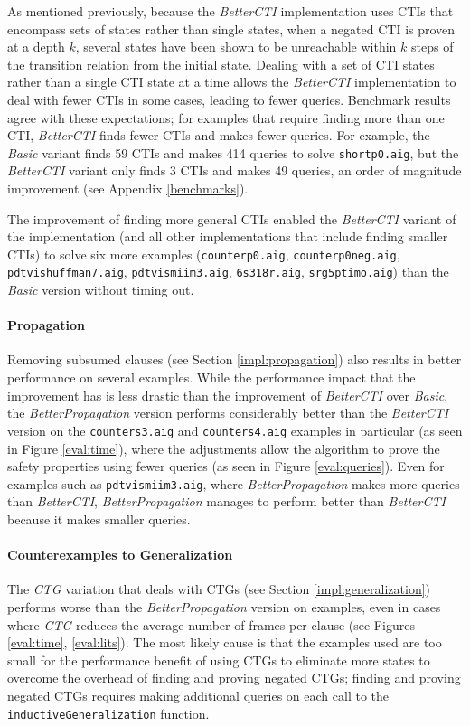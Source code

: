 \documentclass[12pt,a4paper,twoside,openright]{report}
\begin{document}
{{{As mentioned previously, because the \emph{BetterCTI} implementation uses
CTIs that encompass sets of states rather than single states, when a negated CTI is proven at a depth
$k$, several states have been shown to be unreachable within $k$ steps of the transition relation
from the initial state. Dealing with a set of CTI states rather than a single CTI state
at a time allows
the \emph{BetterCTI} implementation to deal with fewer CTIs in some cases,
leading to fewer queries.
Benchmark results
agree with these expectations; for examples that require finding more than one CTI, \emph{BetterCTI}
finds fewer CTIs and makes fewer queries.
For example, the \emph{Basic} variant finds 59 CTIs and makes 414 queries to solve
\verb,shortp0.aig,, but the \emph{BetterCTI} variant only finds 3 CTIs and makes 49 queries, an order of magnitude improvement (see Appendix \ref{benchmarks}). 

The improvement of finding more general CTIs enabled the \emph{BetterCTI} variant of the implementation
(and all other implementations that include finding smaller CTIs) to
solve six more examples (\verb,counterp0.aig,, \verb,counterp0neg.aig,, \verb,pdtvishuffman7.aig,, 
\verb,pdtvismiim3.aig,, \verb,6s318r.aig,, \verb,srg5ptimo.aig,) than the \emph{Basic} version without
timing out.}

\paragraph{Propagation}{
Removing subsumed clauses (see Section \ref{impl:propagation}) also results in better performance on several
examples. While the performance impact that the improvement has is less drastic than the improvement of
\emph{BetterCTI} over \emph{Basic}, the \emph{BetterPropagation} version performs
considerably better
than the \emph{BetterCTI} version on the \verb,counters3.aig, and \verb,counters4.aig, examples in
particular (as seen in Figure \ref{eval:time}), where the adjustments allow the algorithm to prove the safety properties using fewer
queries (as seen in Figure \ref{eval:queries}). Even for examples such as \verb,pdtvismiim3.aig,, where \emph{BetterPropagation} makes more
queries than \emph{BetterCTI}, \emph{BetterPropagation} manages to perform better than \emph{BetterCTI}
because it makes smaller queries.}

\paragraph{Counterexamples to Generalization}{
The \emph{CTG} variation that deals with CTGs (see Section \ref{impl:generalization})
performs worse than the \emph{BetterPropagation} version
on examples, even in cases where \emph{CTG} reduces the average number of frames per clause (see Figures \ref{eval:time}, \ref{eval:lits}).
The most likely cause is that the examples used are too small for the performance benefit of
using CTGs to eliminate more states
to overcome the overhead of finding and proving negated CTGs;
finding and proving negated CTGs requires
making additional queries on each call to the \verb,inductiveGeneralization, function.

}}}
\end{document}
